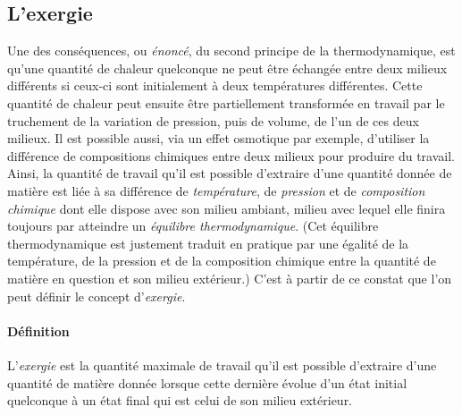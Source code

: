 \documentclass[a4paper,11pt]{scrartcl}
\begin{document}
\subsection{L'exergie} Une des conséquences, ou \emph{énoncé}, du second
principe de la thermodynamique, est qu'une quantité de chaleur quelconque ne
peut être échangée entre deux milieux différents si ceux-ci sont initialement à
deux températures différentes. Cette quantité de chaleur peut ensuite être
partiellement transformée en travail par le truchement de la variation de
pression, puis de volume, de l'un de ces deux milieux. Il est possible aussi,
via un effet osmotique par exemple, d'utiliser la différence de compositions
chimiques entre deux milieux pour produire du travail. Ainsi, la quantité de
travail qu'il est possible d'extraire d'une quantité donnée de matière est liée
à sa différence de \emph{température}, de \emph{pression} et de
\emph{composition chimique} dont elle dispose avec son milieu ambiant, milieu
avec lequel elle finira toujours par atteindre un \emph{équilibre
thermodynamique}.  (Cet équilibre thermodynamique est justement traduit en
pratique par une égalité de la température, de la pression et de la composition
chimique entre la quantité de matière en question et son milieu extérieur.)
C'est à partir de ce constat que l'on peut définir le concept d'\emph{exergie}.

\paragraph{Définition} L'\emph{exergie} est la quantité maximale de travail
qu'il est possible d'extraire d'une quantité de matière donnée lorsque cette
dernière évolue d'un état initial quelconque à un état final qui est celui de
son milieu extérieur.

\bigskip
\end{document}
